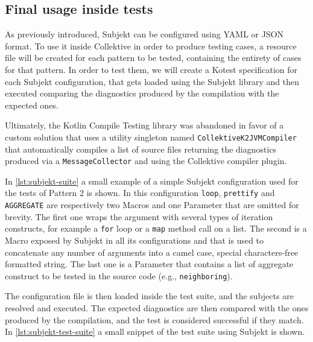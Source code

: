 \documentclass[12pt,a4paper,openright,twoside]{book}
\begin{document}
\subsection{Final usage inside tests}

As previously introduced, Subjekt can be configured using YAML or JSON format.
To use it inside Collektive in order to produce testing cases, a resource file
will be created for each pattern to be tested, containing the entirety of cases
for that pattern. In order to test them, we will create a Kotest specification
for each Subjekt configuration, that gets loaded using the Subjekt library and
then executed comparing the diagnostics produced by the compilation with the
expected ones.

Ultimately, the Kotlin Compile Testing library was abandoned in favor of a
custom solution that uses a utility singleton named
\lstinline{CollektiveK2JVMCompiler} that automatically compiles a list of source
files returning the diagnostics produced via a \lstinline{MessageCollector} and
using the Collektive compiler plugin. 

In \cref{lst:subjekt-suite} a small example of a simple Subjekt configuration
used for the tests of Pattern 2 is shown. In this configuration
\lstinline{loop}, \lstinline{prettify} and \lstinline{AGGREGATE} are
respectively two Macros and one Parameter that are omitted for brevity. The
first one wraps the argument with several types of iteration constructs, for
example a \lstinline{for} loop or a \lstinline{map} method call on a list. The
second is a Macro exposed by Subjekt in all its configurations and that is used
to concatenate any number of arguments into a camel case, special
characters-free formatted string. The last one is a Parameter that contains a
list of aggregate construct to be tested in the source code (e.g.,
\lstinline{neighboring}).



The configuration file is then loaded inside the test suite, and the subjects
are resolved and executed. The expected diagnostics are then compared with the
ones produced by the compilation, and the test is considered successful if they
match. In \cref{lst:subjekt-test-suite} a small snippet of the test suite using
Subjekt is shown.


\end{document}
